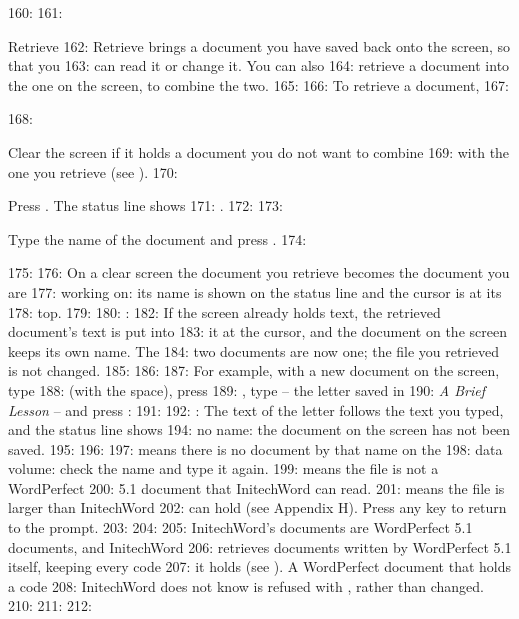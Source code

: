 160: 
161: \begin{Feature}{Retrieve}
162: Retrieve brings a document you have saved back onto the screen, so that you
163: can read it or change it.  You can also
164: retrieve a document into the one on the screen, to combine the two.
165: 
166: To retrieve a document,
167: \begin{WPSteps}
168: \item Clear the screen if it holds a document you do not want to combine
169: with the one you retrieve (see ).
170: \item Press .  The status line shows
171: .
172: 
173: \item Type the name of the document and press .
174: \end{WPSteps}
175: 
176: On a clear screen the document you retrieve becomes the document you are
177: working on: its name is shown on the status line and the cursor is at its
178: top.
179: 
180: : 
182: If the screen already holds text, the retrieved document's text is put into
183: it at the cursor, and the document on the screen keeps its own name.  The
184: two documents are now one; the file you retrieved is not changed.
185: 
186: 
187: For example, with a new document on the screen, type
188:  (with the space), press
189: , type  -- the letter saved in
190: \textit{A Brief Lesson} -- and press :
191: 
192: : The text of the letter follows the text you typed, and the status line shows
194: no name: the document on the screen has not been saved.
195: 
196: 
197:  means there is no document by that name on the
198: data volume: check the name and type it again.
199:  means the file is not a WordPerfect
200: 5.1 document that InitechWord can read.
201:  means the file is larger than InitechWord
202: can hold (see Appendix H).  Press any key to return to the prompt.
203: 
204: 
205: InitechWord's documents are WordPerfect 5.1 documents, and InitechWord
206: retrieves documents written by WordPerfect 5.1 itself, keeping every code
207: it holds (see ).  A WordPerfect document that holds a code
208: InitechWord does not know is refused with , rather than changed.
210: 
211: 
212: \end{Feature}

